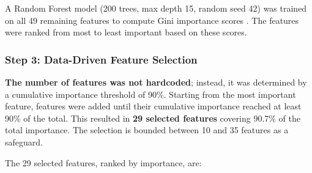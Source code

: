 A Random Forest model (200 trees, max depth 15, random seed 42) was trained on all 49 remaining features to compute Gini importance scores \cite{breiman2001rf,biau2016rf}. The features were ranked from most to least important based on these scores.

\subsubsection*{Step 3: Data-Driven Feature Selection}

\textbf{The number of features was not hardcoded}; instead, it was determined by a cumulative importance threshold of 90\%. Starting from the most important feature, features were added until their cumulative importance reached at least 90\% of the total. This resulted in \textbf{29 selected features} covering 90.7\% of the total importance. The selection is bounded between 10 and 35 features as a safeguard.

The 29 selected features, ranked by importance, are:

